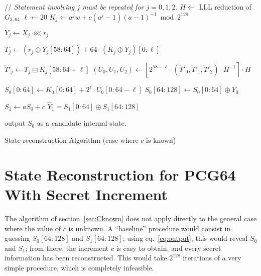 \documentclass[journal=tosc,final]{iacrtrans}
\begin{document}
\begin{algorithm}
\begin{algorithmic}[1]
  \State // \emph{Statement involving $j$ must be repeated for $j=0, 1, 2$.}
  \State $H \gets$ LLL reduction of $G_{3,64}$
  \State $\ell \gets 20$
   
    \State $K_j \gets a^j w + c (a^j - 1)(a-1)^{-1} \bmod 2^{128}$    
    
     
    
    \State $Y_j \gets X_j \lll r_j$ 
    
    \State $T_j \gets \left(r_j \oplus Y_j[58:64]\right) +  64 \cdot \left(K_j \oplus Y_j\right)[0:\ell]$  
    
    \State $\widetilde T'_j \gets T_j \boxminus K_j[58:64+\ell]$  
    \State $(U_0, U_1, U_2) \gets \left\lfloor 2^{58-\ell} \cdot (\widetilde T'_0, \widetilde T'_1, \widetilde T'_2) \cdot  H^{-1} \right\rceil \cdot H$ 

    \State $S_0[0:64] \gets  K_0[0:64] + 2^{\ell} \cdot U_0[0:64-\ell]$ 
    \State $S_0[64:128] \gets S_0[0:64] \oplus Y_0$ 
    
    \State $S_1 \gets a  S_0 + c$ 
    \State $\widehat{Y}_1 =  S_1[0:64] \oplus  S_1[64:128]$
    
     
    \State output $S_0$ as a candidate internal state.
    \EndIf
    \EndFor
    \EndFor
    \EndProcedure
  \end{algorithmic}
  \caption{State reconstruction Algorithm (case where $c$ is known)}
  \label{algo:known}
\end{algorithm}
  
\section{State Reconstruction for \textsf{PCG64} With Secret Increment}
\label{sec:Cunknown}

The algorithm of section~\ref{sec:Cknown} does not apply directly to the general
case where the value of $c$ is unknown. A ``baseline'' procedure would consist
in guessing $S_0[64:128]$ and $S_1[64:128]$; using eq.~\eqref{eq:output}, this
would reveal $S_0$ and $S_1$; from there, the increment $c$ is easy to obtain,
and every secret information has been reconstructed. This would take $2^{128}$
iterations of a very simple procedure, which is completely infeasible.
\end{document}
